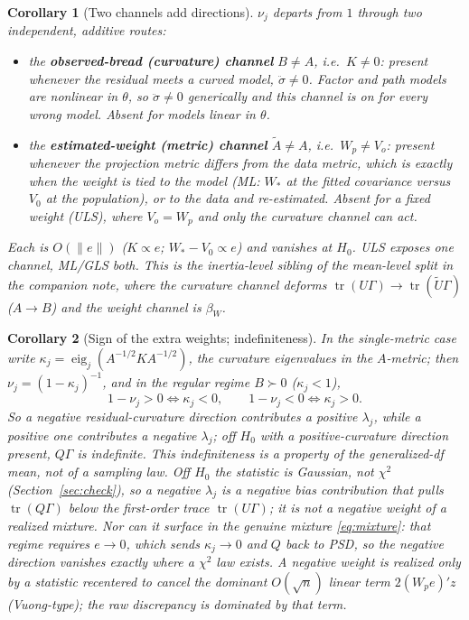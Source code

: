 \documentclass[11pt]{article}
\newcommand{\tr}{\operatorname{tr}}
\theoremstyle{plain}
\newtheorem{corollary}{Corollary}
\theoremstyle{remark}
\begin{document}
\begin{corollary}[Two channels add directions]\label{cor:channels}
$\nu_j$ departs from $1$ through two independent, additive routes:
\begin{itemize}
\item the \textbf{observed-bread (curvature) channel} $B\neq A$, i.e.\ $K\neq0$:
present whenever the residual meets a curved model, $\ddot\sigma\neq0$. Factor and
path models are nonlinear in $\theta$, so $\ddot\sigma\neq0$ generically and this
channel is on for every wrong model. Absent for models linear in $\theta$.
\item the \textbf{estimated-weight (metric) channel} $\tilde A\neq A$, i.e.\
$W_{\!p}\neq V_{\!o}$: present whenever the projection metric differs from the
data metric, which is exactly when the weight is tied to the model
(ML: $W_\ast$ at the fitted covariance versus $V_0$ at the population), or to the
data and re-estimated. Absent for a fixed weight (ULS), where $V_{\!o}=W_{\!p}$
and only the curvature channel can act.
\end{itemize}
Each is $O(\lVert e\rVert)$ ($K\propto e$; $W_\ast-V_0\propto e$) and vanishes at
$H_0$. ULS exposes one channel, ML/GLS both. This is the inertia-level sibling of
the mean-level split in the companion note, where the curvature channel deforms
$\tr(U\Gamma)\to\tr(\tilde U\Gamma)$ ($A\!\to\!B$) and the weight channel is
$\beta_W$.
\end{corollary}

\begin{corollary}[Sign of the extra weights; indefiniteness]\label{cor:sign}
In the single-metric case write $\kappa_j=\operatorname{eig}_j(A^{-1/2}KA^{-1/2})$,
the curvature eigenvalues in the $A$-metric; then $\nu_j=(1-\kappa_j)^{-1}$, and
in the regular regime $B\succ0$ ($\kappa_j<1$),
\[
  1-\nu_j>0\iff\kappa_j<0,\qquad 1-\nu_j<0\iff\kappa_j>0 .
\]
So a \emph{negative} residual-curvature direction contributes a \emph{positive}
$\lambda_j$, while a \emph{positive} one contributes a \emph{negative} $\lambda_j$;
off $H_0$ with a positive-curvature direction present, $Q\Gamma$ is indefinite.
This indefiniteness is a property of the generalized-df \emph{mean}, not of a
sampling law. Off $H_0$ the statistic is Gaussian, not $\chi^2$
(Section~\ref{sec:check}), so a negative $\lambda_j$ is a negative \emph{bias}
contribution that pulls $\tr(Q\Gamma)$ below the first-order trace $\tr(U\Gamma)$;
it is not a negative weight of a realized mixture. Nor can it surface in the
genuine mixture \eqref{eq:mixture}: that regime requires $e\to0$, which sends
$\kappa_j\to0$ and $Q$ back to PSD, so the negative direction vanishes exactly
where a $\chi^2$ law exists. A negative weight is realized only by a statistic
recentered to cancel the dominant $O(\sqrt n)$ linear term $2(W_{\!p}e)'z$
(Vuong-type); the raw discrepancy is dominated by that term.
\end{corollary}
\end{document}
